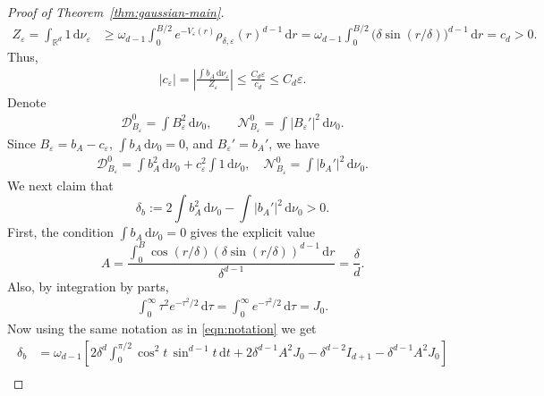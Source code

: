 \documentclass[11pt,reqno]{amsart}
\numberwithin{equation}{section}
\theoremstyle{definition}
\theoremstyle{remark}
\newcounter{parts}
\newcommand{\ud}{\mathrm{d}}
\newcommand{\0}{\emptyset}
\newcommand{\veps}{\varepsilon}
\newcommand{\bbR}{\mathbb R}
\newcommand{\calD}{\mathcal D}
\newcommand{\calN}{\mathcal N}
\begin{document}
\begin{proof}[Proof of Theorem~\ref{thm:gaussian-main}]
\begin{align}
        Z_\veps
        =
        \int_{\bbR^d}1\,\ud\nu_\veps
        &\geq
        \omega_{d-1}
        \int_0^{B/2}
        e^{-V_\veps(r)}
        \rho_{\delta,\veps}(r)^{d-1}\,\ud r=
        \omega_{d-1}
        \int_0^{B/2}
        \bigl(\delta\sin(r/\delta)\bigr)^{d-1}\,\ud r
        =
        c_d>0.
\end{align}
Thus,
\begin{align}\label{eqn:c_eps-bound}
        |c_\veps|
        =
        \left|
        \frac{\int b_A\,\ud\nu_\veps}{Z_\veps}
        \right|
        \leq
        \frac{C_d\veps}{c_d}
        \leq
        C_d\veps.
\end{align}
Denote
\begin{align}
        \calD_{B_\veps}^0
        =
        \int B_\veps^2\,\ud\nu_0,
        \qquad
        \calN_{B_\veps}^0
        =
        \int |B_\veps'|^2\,\ud\nu_0.
\end{align}
Since \(B_\veps=b_A-c_\veps\), \(\int b_A\,\ud\nu_0=0\), and
\(B_\veps'=b_A'\), we have
\begin{align}
        \calD_{B_\veps}^0
        =
        \int b_A^2\,\ud\nu_0
        +
        c_\veps^2\int1\,\ud\nu_0,\quad \calN_{B_\veps}^0
        =
        \int |b_A'|^2\,\ud\nu_0.
\end{align}
We next claim that
\[
        \delta_b
        :=
        2\int b_A^2\,\ud\nu_0
        -
        \int |b_A'|^2\,\ud\nu_0
        >0.
\]
First, the condition \(\int b_A\,\ud\nu_0=0\) gives the explicit value
\[
        A
        =
        \frac{
        \int_0^B
        \cos(r/\delta)(\delta\sin(r/\delta))^{d-1}\,\ud r
        }{\delta^{d-1}}
        =
        \frac{\delta}{d}.
\]
Also, by integration by parts,
\begin{align}
        \int_0^\infty \tau^2e^{-\tau^2/2}\,\ud\tau
        =
        \int_0^\infty e^{-\tau^2/2}\,\ud\tau
        =J_0.
\end{align}
Now using the same notation as in \eqref{eqn:notation} we get
\begin{align}
        \delta_b
        &=
        \omega_{d-1}
        \left[
        2\delta^d\int_0^{\pi/2}\cos^2t\,\sin^{d-1}t\,\ud t
        +
        2\delta^{d-1}A^2J_0
        -
        \delta^{d-2}I_{d+1}
        -
        \delta^{d-1}A^2J_0
        \right] \\

\end{align}
\end{proof}
\end{document}
